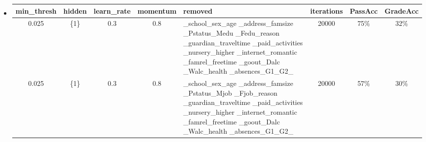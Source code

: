 \documentclass[11pt]{article}
\begin{document}
\begin{itemize}
\item 
\begin{tabular}{| c | c | c | c | p{3cm} | c | c | c |}
\hline \textbf{min\_thresh} & \textbf{hidden} & \textbf{learn\_rate} & \textbf{momentum} & \textbf{removed} & \textbf{iterations} & \textbf{PassAcc} & \textbf{GradeAcc}\\
\hline 0.025 & \{1\} & 0.3 & 0.8 & \_school\_sex\_age \_address\_famsize \_Pstatus\_Medu \_Fedu\_reason \_guardian\_traveltime \_paid\_activities \_nursery\_higher \_internet\_romantic \_famrel\_freetime \_goout\_Dalc \_Walc\_health \_absences\_G1\_G2\_ & 20000 & 75\% & 32\%\\
\hline 0.025 & \{1\} & 0.3 & 0.8 & \_school\_sex\_age \_address\_famsize \_Pstatus\_Mjob \_Fjob\_reason \_guardian\_traveltime \_paid\_activities \_nursery\_higher \_internet\_romantic \_famrel\_freetime \_goout\_Dalc \_Walc\_health \_absences\_G1\_G2\_ & 20000 & 57\% & 30\%\\
\hline
\end{tabular}


\end{itemize}
\end{document}
